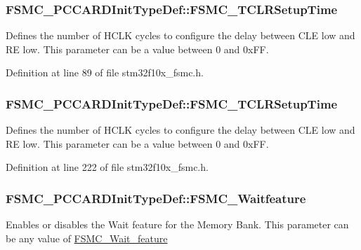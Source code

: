 \subsubsection[{\texorpdfstring{F\+S\+M\+C\+\_\+\+T\+C\+L\+R\+Setup\+Time}{FSMC_TCLRSetupTime}}]{ F\+S\+M\+C\+\_\+\+P\+C\+C\+A\+R\+D\+Init\+Type\+Def\+::\+F\+S\+M\+C\+\_\+\+T\+C\+L\+R\+Setup\+Time}\hypertarget{struct_f_s_m_c___p_c_c_a_r_d_init_type_def_a40cec452b1d528e73d45bb0395df1ea3}{}\label{struct_f_s_m_c___p_c_c_a_r_d_init_type_def_a40cec452b1d528e73d45bb0395df1ea3}
Defines the number of H\+C\+LK cycles to configure the delay between C\+LE low and RE low. This parameter can be a value between 0 and 0x\+FF. 

Definition at line 89 of file stm32f10x\+\_\+fsmc.\+h.

\subsubsection[{\texorpdfstring{F\+S\+M\+C\+\_\+\+T\+C\+L\+R\+Setup\+Time}{FSMC_TCLRSetupTime}}]{ F\+S\+M\+C\+\_\+\+P\+C\+C\+A\+R\+D\+Init\+Type\+Def\+::\+F\+S\+M\+C\+\_\+\+T\+C\+L\+R\+Setup\+Time}\hypertarget{struct_f_s_m_c___p_c_c_a_r_d_init_type_def_a15db9675791f6f9c7fd82fe1084ff694}{}\label{struct_f_s_m_c___p_c_c_a_r_d_init_type_def_a15db9675791f6f9c7fd82fe1084ff694}
Defines the number of H\+C\+LK cycles to configure the delay between C\+LE low and RE low. This parameter can be a value between 0 and 0x\+FF. 

Definition at line 222 of file stm32f10x\+\_\+fsmc.\+h.

\subsubsection[{\texorpdfstring{F\+S\+M\+C\+\_\+\+Waitfeature}{FSMC_Waitfeature}}]{ F\+S\+M\+C\+\_\+\+P\+C\+C\+A\+R\+D\+Init\+Type\+Def\+::\+F\+S\+M\+C\+\_\+\+Waitfeature}\hypertarget{struct_f_s_m_c___p_c_c_a_r_d_init_type_def_a7e197ef7f3d5a1e6bf5b52b1224d59c1}{}\label{struct_f_s_m_c___p_c_c_a_r_d_init_type_def_a7e197ef7f3d5a1e6bf5b52b1224d59c1}
Enables or disables the Wait feature for the Memory Bank. This parameter can be any value of \hyperlink{group___f_s_m_c___wait__feature}{F\+S\+M\+C\+\_\+\+Wait\+\_\+feature} 

